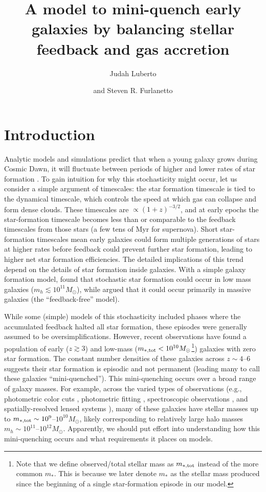 \documentclass[a4paper,11pt]{article}
\title{A model to mini-quench early galaxies by balancing stellar feedback and gas accretion}
\author{Judah Luberto}
\author[]{and Steven R. Furlanetto}
\affiliation{Department of Physics and Astronomy, University of California, \\
475 Portola Plaza, Los Angeles, CA, USA}
\begin{document}
\maketitle
\flushbottom

\section{Introduction} \label{sec:intro}

Analytic models and simulations predict that when a young galaxy grows during Cosmic Dawn, it will fluctuate between periods of higher and lower rates of star formation \cite{Stinson2007_breathing, Merlin2012, Faucher-Giguere2018, Orr2019}. To gain intuition for why this stochasticity might occur, let us consider a simple argument of timescales: the star formation timescale is tied to the dynamical timescale, which controls the speed at which gas can collapse and form dense clouds. These timescales are $\propto (1 + z)^{-3/2}$, and at early epochs the star-formation timescale becomes less than or comparable to the feedback timescales from those stars (a few tens of Myr for supernova). Short star-formation timescales mean early galaxies could form multiple generations of stars at higher rates before feedback could prevent further star formation, leading to higher net star formation efficiencies. The detailed implications of this trend depend on the details of star formation inside galaxies. With a simple galaxy formation model, \cite{Furlanetto2022} found that stochastic star formation could occur in low mass galaxies ($m_{h} \lesssim 10^{11} M_{\odot}$), while \cite{Dekel2023_FFB} argued that it could occur primarily in massive galaxies (the ``feedback-free'' model). 

While some (simple) models of this stochasticity included phases where the accumulated feedback halted all star formation, these episodes were generally assumed to be oversimplifications. However, recent observations have found a population of early ($z \gtrsim 3$) and low-mass ($m_{*, \rm tot} < 10^{10} M_{\odot}$\footnote{Note that we define observed/total stellar mass as $m_{*, \rm tot}$ instead of the more common $m_{*}$. This is because we later denote $m_{*}$ as the stellar mass produced since the beginning of a single star-formation episode in our model.}) galaxies with zero star formation. The constant number densities of these galaxies across $z \sim 4$--$6$ suggests their star formation is episodic and not permanent \cite{Yang2025, Merlin2025} (leading many to call these galaxies ``mini-quenched''). This mini-quenching occurs over a broad range of galaxy masses. For example, across the varied types of observations (e.g., photometric color cuts \cite{Valentino2023, Alberts2024}, photometric fitting \cite{Merlin2025}, spectroscopic observations \cite{Marchesini2023, Strait2023, Looser2024, Covelo-Paz2026}, and spatially-resolved lensed systems \cite{Hutchinson2025, Messa2025}), many of these galaxies have stellar masses up to $m_{*, \rm tot} \sim 10^{9}$--$10^{10} M_{\odot}$, likely corresponding to relatively large halo masses $m_{h} \sim 10^{11}$--$10^{12} M_{\odot}$. 
Apparently, we should put effort into understanding how this mini-quenching occurs and what requirements it places on models. 
\end{document}
